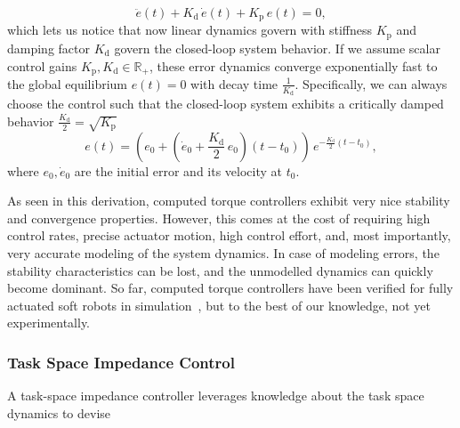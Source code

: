 \begin{equation}
    \ddot{e}(t) + K_\mathrm{d} \, \dot{e}(t) + K_\mathrm{p} \, e(t) = 0,
\end{equation}
which lets us notice that now linear dynamics govern with stiffness $K_\mathrm{p}$ and damping factor $K_\mathrm{d}$ govern the closed-loop system behavior.
If we assume scalar control gains $K_\mathrm{p}, K_\mathrm{d} \in \mathbb{R}_+$, these error dynamics converge exponentially fast to the global equilibrium $e(t) = 0$ with decay time $\frac{1}{K_\mathrm{d}}$. Specifically, we can always choose the control such that the closed-loop system exhibits a critically damped behavior $\frac{K_\mathrm{d}}{2} = \sqrt{K_\mathrm{p}}$
\begin{equation}
    e(t) = \left ( e_0 + \left ( \dot{e}_0 + \frac{K_\mathrm{d}}{2} \, e_0 \right ) (t-t_0) \right ) \, e^{-\frac{K_\mathrm{d}}{2} (t - t_0)},
\end{equation}
where $e_0, \dot{e}_0$ are the initial error and its velocity at $t_0$.

As seen in this derivation, computed torque controllers exhibit very nice stability and convergence properties. However, this comes at the cost of requiring high control rates, precise actuator motion, high control effort, and, most importantly, very accurate modeling of the system dynamics. In case of modeling errors, the stability characteristics can be lost, and the unmodelled dynamics can quickly become dominant.
So far, computed torque controllers have been verified for fully actuated soft robots in simulation~\citep{boyer2006macro, pustina2024unified}, but to the best of our knowledge, not yet experimentally.


\subsubsection{Task Space Impedance Control}
A task-space impedance controller leverages knowledge about the task space dynamics to devise 